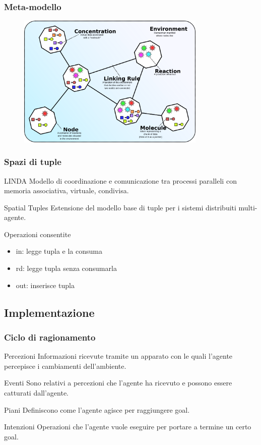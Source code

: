 \documentclass[handout]{beamer}\mode<presentation>{\usetheme{AMSCesenaBleu}}
\begin{document}
\begin{frame}
\frametitle{Meta-modello}
\begin{figure}
\includegraphics[width=9cm]{images/alchemistModel.png}
\end{figure}
\end{frame}

\begin{frame}
\frametitle{Spazi di tuple}
\begin{block}{LINDA}
Modello di coordinazione e comunicazione tra processi paralleli con memoria associativa, virtuale, condivisa.
\end{block}
\begin{block}{Spatial Tuples}
Estensione del modello base di tuple per i sistemi distribuiti multi-agente.
\vspace{0.2cm}

Operazioni consentite
\begin{itemize}
\item in: legge tupla e la consuma
\item rd: legge tupla senza consumarla
\item out: inserisce tupla
\end{itemize}
\end{block}
\end{frame}

\subsection{Implementazione}

\begin{frame}
\frametitle{Ciclo di ragionamento}
\begin{block}{Percezioni}
Informazioni ricevute tramite un apparato con le quali l'agente percepisce i cambiamenti dell'ambiente.
\end{block}

\begin{block}{Eventi}
Sono relativi a percezioni che l'agente ha ricevuto e possono essere catturati dall'agente.
\end{block}

\begin{block}{Piani}
Definiscono come l'agente agisce per raggiungere goal.
\end{block}

\begin{block}{Intenzioni}
Operazioni che l'agente vuole eseguire per portare a termine un certo goal.
\end{block}
\end{frame}
\end{document}
